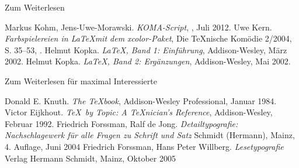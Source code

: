 \begin{Frame}[fragile]{Zum Weiterlesen}
  \begin{mybib}
      Markus Kohm, Jens-Uwe-Morawski.
      \newblock \emph{KOMA-Script},
      \newblock {}, Juli 2012.
      Uwe Kern.
      \newblock \emph{Farbspielereien in \LaTeX mit dem xcolor-Paket},
      \newblock Die \TeX nische Komödie 2/2004, S. 35--53,
      \newblock {}.
      Helmut Kopka.
      \newblock \emph{\LaTeX, Band 1: Einführung},
      \newblock Addison-Wesley, März 2002.
      Helmut Kopka.
      \newblock \emph{\LaTeX, Band 2: Ergänzungen},
      \newblock Addison-Wesley, Mai 2002.
  \end{mybib}
\end{Frame}

\begin{Frame}[fragile]{Zum Weiterlesen für maximal Interessierte}
  \begin{mybib}
      Donald E. Knuth.
      \newblock \emph{The \TeX book},
      \newblock Addison-Wesley Professional, Januar 1984.
      Victor Eijkhout.
      \newblock \emph{\TeX\ by Topic: A \TeX nician's Reference},
      \newblock Addison-Wesley, Februar 1992.
      Friedrich Forssman, Ralf de Jong.
      \newblock \emph{Detailtypografie: Nachschlagewerk für alle Fragen zu Schrift und Satz}
      \newblock Schmidt (Hermann), Mainz, 4. Auflage, Juni 2004
      Friedrich Forssman, Hans Peter Willberg.
      \newblock \emph{Lesetypografie}
      \newblock Verlag Hermann Schmidt, Mainz, Oktober 2005
  \end{mybib}
\end{Frame}
